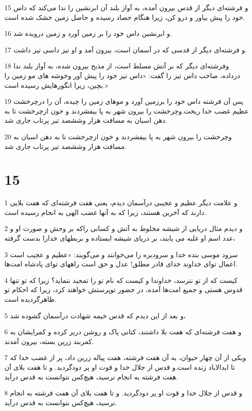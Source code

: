 \par 15 و فرشته‌ای دیگر از قدس بیرون آمده، به آواز بلند آن ابرنشین را ندا می‌کند که داس خود را پیش بیاور و درو کن، زیرا هنگام حصاد رسیده و حاصل زمین خشک شده است.
\par 16 و ابرنشین داس خود را بر زمین آورد و زمین درویده شد.
\par 17 و فرشته‌ای دیگر از قدسی که در آسمان است، بیرون آمد و او نیز داسی تیز داشت.
\par 18 وفرشته‌ای دیگر که بر آتش مسلط است، از مذبح بیرون شده، به آواز بلند ندا در‌داده، صاحب داس تیز را گفت: «داس تیز خود را پیش آور وخوشه های مو زمین را بچین، زیرا انگورهایش رسیده است.»
\par 19 پس آن فرشته داس خود را برزمین آورد و موهای زمین را چیده، آن را درچرخشت عظیم غضب خدا ریخت.وچرخشت را بیرون شهر به پا بیفشردند و خون ازچرخشت تا به دهن اسبان به مسافت هزار وششصد تیر پرتاب جاری شد.
\par 20 وچرخشت را بیرون شهر به پا بیفشردند و خون ازچرخشت تا به دهن اسبان به مسافت هزار وششصد تیر پرتاب جاری شد.

\chapter{15}

\par 1 و علامت دیگر عظیم و عجیبی درآسمان دیدم، یعنی هفت فرشته‌ای که هفت بلایی دارند که آخرین هستند، زیرا که به آنها غضب الهی به انجام رسیده است.
\par 2 و دیدم مثال دریایی از شیشه مخلوط به آتش و کسانی راکه بر وحش و صورت او و عدد اسم او غلبه می یابند، بر دریای شیشه ایستاده و بربطهای خدارا بدست گرفته،
\par 3 سرود موسی بنده خدا و سرودبره را می‌خوانند و می‌گویند: «عظیم و عجیب است اعمال تو‌ای خداوند خدای قادر مطلق! عدل و حق است راههای تو‌ای پادشاه امت‌ها.
\par 4 کیست که از تو نترسد، خداوندا و کیست که نام تو را تمجید ننماید؟ زیرا که تو تنها قدوس هستی و جمیع امت‌ها آمده، در حضور توپرستش خواهند کرد، زیرا که احکام تو ظاهرگردیده است.
\par 5 و بعد از این دیدم که قدس خیمه شهادت درآسمان گشوده شد،
\par 6 و هفت فرشته‌ای که هفت بلا داشتند، کتانی پاک و روشن دربر کرده و کمرایشان به کمربند زرین بسته، بیرون آمدند.
\par 7 ویکی از آن چهار حیوان، به آن هفت فرشته، هفت پیاله زرین داد، پر از غضب خدا که تا ابدالاباد زنده است.و قدس از جلال خدا و قوت او پر دودگردید. و تا هفت بلای آن هفت فرشته به انجام نرسید، هیچ‌کس نتوانست به قدس درآید.
\par 8 و قدس از جلال خدا و قوت او پر دودگردید. و تا هفت بلای آن هفت فرشته به انجام نرسید، هیچ‌کس نتوانست به قدس درآید.

